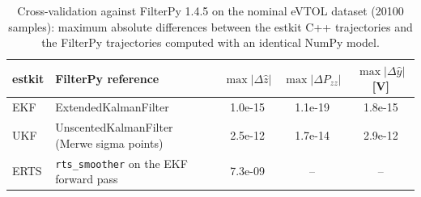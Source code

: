 \begin{table}[H]\centering\footnotesize\setlength{\tabcolsep}{4pt}\caption{Cross-validation against FilterPy 1.4.5 on the nominal eVTOL dataset (20100 samples): maximum absolute differences between the estkit C++ trajectories and the FilterPy trajectories computed with an identical NumPy model.}\label{tab:val_filterpy}
\begin{tabular}{llccc}\toprule estkit & FilterPy reference & $\max|\Delta \hat z|$ & $\max|\Delta P_{zz}|$ & $\max|\Delta \hat y|$ [V] \\ \midrule
EKF & ExtendedKalmanFilter & 1.0e-15 & 1.1e-19 & 1.8e-15 \\
UKF & UnscentedKalmanFilter (Merwe sigma points) & 2.5e-12 & 1.7e-14 & 2.9e-12 \\
ERTS & \texttt{rts\_smoother} on the EKF forward pass & 7.3e-09 & -- & -- \\
\bottomrule\end{tabular}\end{table}
